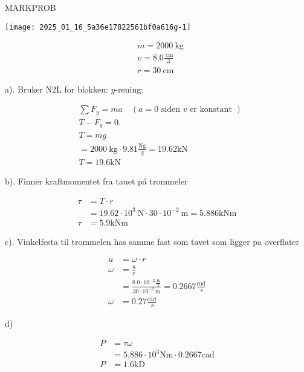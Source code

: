 \documentclass[10pt]{article}
\begin{document}
MARKPROB

\begin{center}
\texttt{[image: 2025\_01\_16\_5a36e17822561bf0a616g-1]}
\end{center}

$$
\begin{aligned}
& m=2000 \mathrm{~kg} \\
& v=8.0 \frac{\mathrm{~cm}}{3} \\
& r=30 \mathrm{~cm}
\end{aligned}
$$

a). Bruker N2L for blokken: $y$-rening:

$$
\begin{aligned}
& \sum F_{y}=m a \quad(a=0 \text { siden } v \text { er konstant }) \\
& T-F_{g}=0 . \\
& T=m g \\
& =2000 \mathrm{~kg} \cdot 9.81 \frac{\mathrm{Ng}}{\mathrm{~g}}=19.62 \mathrm{kN} \\
& T=19.6 \mathrm{kN}
\end{aligned}
$$

b). Finner kraftmomentet fra tauet pá trommeler

$$
\begin{aligned}
\tau & =T \cdot r \\
& =19.62 \cdot 10^{3} \mathrm{~N} \cdot 30 \cdot 10^{-2} \mathrm{~m}=5.886 \mathrm{kNm} \\
\tau & =5.9 \mathrm{kNm}
\end{aligned}
$$

c). Vinkelfesta til trommelen has samme fast som tavet som ligger pa overflater

$$
\begin{aligned}
u & =\omega \cdot r \\
\omega & =\frac{u}{r} \\
& =\frac{8.0 \cdot 10^{-2} \frac{\mathrm{~m}}{\mathrm{~s}}}{30 \cdot 10^{-2} \mathrm{~m}}=0.2667 \frac{\mathrm{rod}}{\mathrm{~s}} \\
\omega & =0.27 \frac{\mathrm{cad}}{\mathrm{~s}}
\end{aligned}
$$

d)

$$
\begin{aligned}
P & =\tau \omega \\
& =5.886 \cdot 10^{3} \mathrm{Nm} \cdot 0.2667 \mathrm{cad} \\
P & =1.6 \mathrm{kD}
\end{aligned}
$$
\end{document}
